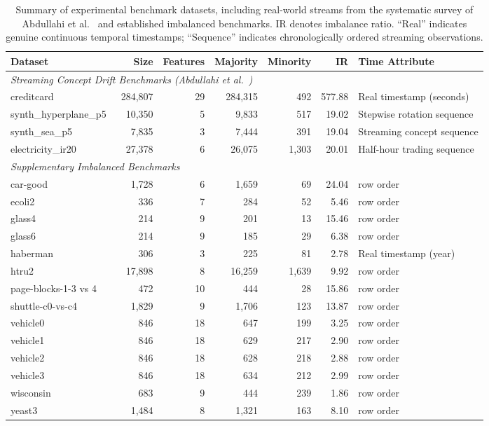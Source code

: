 \documentclass[preprint,10pt]{elsarticle}
\begin{document}
\begin{table}[!htbp]
\centering\small
\caption{Summary of experimental benchmark datasets, including real-world streams from the systematic survey of Abdullahi et al.~\cite{abdullahi2025} and established imbalanced benchmarks. IR denotes imbalance ratio. ``Real'' indicates genuine continuous temporal timestamps; ``Sequence'' indicates chronologically ordered streaming observations.}\label{tab:data}
\begin{tabular}{lrrrrrl}
\toprule
Dataset & Size & Features & Majority & Minority & IR & Time Attribute\\
\midrule
\multicolumn{7}{l}{\emph{Streaming Concept Drift Benchmarks (Abdullahi et al.~\cite{abdullahi2025})}}\\
creditcard~\cite{tang2022} & 284,807 & 29 & 284,315 & 492 & 577.88 & Real timestamp (seconds)\\
synth\_hyperplane\_p5~\cite{wang2024quad,han2015} & 10,350 & 5 & 9,833 & 517 & 19.02 & Stepwise rotation sequence\\
synth\_sea\_p5~\cite{qiao2022} & 7,835 & 3 & 7,444 & 391 & 19.04 & Streaming concept sequence\\
electricity\_ir20~\cite{heidrich2022,mulimani2022} & 27,378 & 6 & 26,075 & 1,303 & 20.01 & Half-hour trading sequence\\
\midrule
\multicolumn{7}{l}{\emph{Supplementary Imbalanced Benchmarks}}\\
car-good & 1,728 & 6 & 1,659 & 69 & 24.04 & row order\\
ecoli2 & 336 & 7 & 284 & 52 & 5.46 & row order\\
glass4 & 214 & 9 & 201 & 13 & 15.46 & row order\\
glass6 & 214 & 9 & 185 & 29 & 6.38 & row order\\
haberman & 306 & 3 & 225 & 81 & 2.78 & Real timestamp (year)\\
htru2 & 17,898 & 8 & 16,259 & 1,639 & 9.92 & row order\\
page-blocks-1-3 vs 4 & 472 & 10 & 444 & 28 & 15.86 & row order\\
shuttle-c0-vs-c4 & 1,829 & 9 & 1,706 & 123 & 13.87 & row order\\
vehicle0 & 846 & 18 & 647 & 199 & 3.25 & row order\\
vehicle1 & 846 & 18 & 629 & 217 & 2.90 & row order\\
vehicle2 & 846 & 18 & 628 & 218 & 2.88 & row order\\
vehicle3 & 846 & 18 & 634 & 212 & 2.99 & row order\\
wisconsin & 683 & 9 & 444 & 239 & 1.86 & row order\\
yeast3 & 1,484 & 8 & 1,321 & 163 & 8.10 & row order\\
\bottomrule
\end{tabular}
\end{table}
\end{document}
